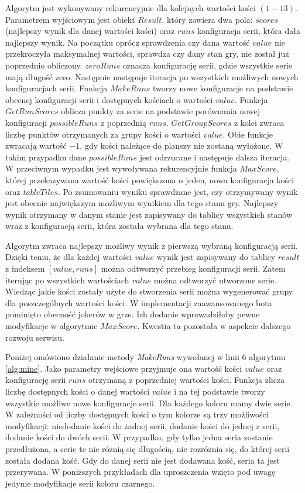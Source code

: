 Algorytm jest wykonywany rekurencyjnie dla kolejnych wartości kości $(1-13)$. Parametrem wyjściowym jest obiekt $Result$, który zawiera dwa pola: $scores$ (najlepszy wynik dla danej wartości kości) oraz $runs$ konfiguracja serii, która dała najlepszy wynik. Na początku oprócz sprawdzenia czy dana wartość $value$ nie przekroczyła maksymalnej wartości, sprawdza czy dany stan gry, nie został już poprzednio obliczony. $zeroRuns$ oznacza konfigurację serii, gdzie wszystkie serie mają długość zero. Następnie następuje iteracja po wszystkich możliwych nowych konfiguracjach serii. Funkcja $MakeRuns$ tworzy nowe konfiguracje na podstawie obecnej konfiguracji serii i dostępnych kościach o wartości $value$. Funkcja $GetRunScores$ oblicza punkty za serie na podstawie porównania nowej konfiguracji $possibleRuns$ z poprzednią $runs$. $GetGroupScores$ z kolei zwraca liczbę punktów otrzymanych za grupy kości o wartości $value$. Obie funkcje zwracają wartość $-1$, gdy kości należące do planszy nie zostaną wyłożone. W takim przypadku dane $possibleRuns$ jest odrzucane i następuje dalsza iteracja. W przeciwnym wypadku jest wywoływana rekurencyjnie funkcja $MaxScore$, której przekazywana wartość kości powiększona o jeden, nowa konfiguracja kości oraz $tableTiles$. Po zsumowaniu wyniku sprawdzane jest, czy otrzymywany wynik jest obecnie największym możliwym wynikiem dla tego stanu gry. Najlepszy wynik otrzymany w %
danym stanie jest zapisywany do tablicy wszystkich stanów wraz z konfiguracją serii, która została wybrana dla tego stanu. 

Algorytm zwraca najlepszy możliwy wynik z pierwszą wybraną konfiguracją serii. Dzięki temu, że dla każdej wartości $value$ wynik jest zapisywany do tablicy $result$ z indeksem $[value, runs]$ można odtworzyć przebieg konfiguracji serii. Zatem iterując po wszystkich wartościach $value$ można odtworzyć utworzone serie. Wiedząc jakie kości zostały użyte do stworzenia serii można wygenerować grupy dla poszczególnych wartości kości. W implementacji zaawansowanego bota pominięto obecność jokerów w grze. Ich dodanie wprowadziłoby pewne modyfikacje w algorytmie $MaxScore$. Kwestia ta pozostała w aspekcie dalszego rozwoju serwisu. 

Poniżej omówiono działanie metody \emph{MakeRuns} wywołanej w linii 6 algorytmu \ref{alg:mine}.
Jako parametry wejściowe przyjmuje ona wartość kości $value$ oraz konfigurację serii $runs$ otrzymaną z poprzedniej wartości kości. 
Funkcja zlicza liczbę dostępnych kości o danej wartości $value$ i na tej podstawie tworzy wszystkie możliwe nowe konfiguracje serii. Dla każdego koloru mamy dwie serie. W zależności od liczby dostępnych kości o tym kolorze są trzy możliwości modyfikacji: niedodanie kości do żadnej serii, dodanie kości do jednej z serii, dodanie kości do dwóch serii. W przypadku, gdy tylko jedna seria zostanie przedłużona, a serie te nie różnią się długością, nie rozróżnia się, do której serii została dodana kość. Gdy do danej serii nie jest dodawana kość, seria ta jest przerywana. W poniższych przykładach dla uproszczenia wzięto pod uwagę jedynie modyfikacje serii koloru czarnego. %

